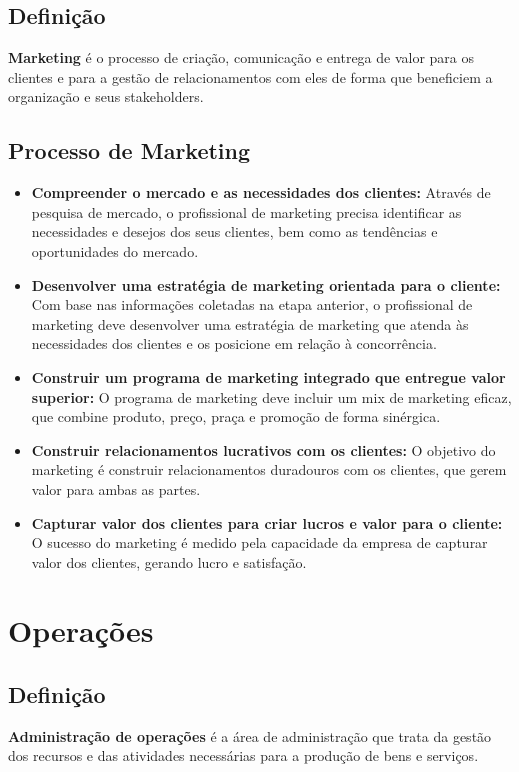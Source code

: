 \documentclass{article}
\begin{document}
\subsection{Definição}
\textbf{Marketing} é o processo de criação, comunicação e entrega de valor para os clientes e para a gestão de relacionamentos com eles de forma que beneficiem a organização e seus stakeholders.

\subsection{Processo de Marketing}
\begin{itemize}
    \item \textbf{Compreender o mercado e as necessidades dos clientes:} Através de pesquisa de mercado, o profissional de marketing precisa identificar as necessidades e desejos dos seus clientes, bem como as tendências e oportunidades do mercado.
    \item \textbf{Desenvolver uma estratégia de marketing orientada para o cliente:} Com base nas informações coletadas na etapa anterior, o profissional de marketing deve desenvolver uma estratégia de marketing que atenda às necessidades dos clientes e os posicione em relação à concorrência.
    \item \textbf{Construir um programa de marketing integrado que entregue valor superior:} O programa de marketing deve incluir um mix de marketing eficaz, que combine produto, preço, praça e promoção de forma sinérgica.
    \item \textbf{Construir relacionamentos lucrativos com os clientes:} O objetivo do marketing é construir relacionamentos duradouros com os clientes, que gerem valor para ambas as partes.
    \item \textbf{Capturar valor dos clientes para criar lucros e valor para o cliente:} O sucesso do marketing é medido pela capacidade da empresa de capturar valor dos clientes, gerando lucro e satisfação.
\end{itemize}

\section{Operações}

\subsection{Definição}
\textbf{Administração de operações} é a área de administração que trata da gestão dos recursos e das atividades necessárias para a produção de bens e serviços.
\end{document}

